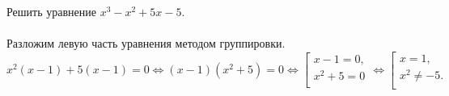\newcommand{\LRA}{\Leftrightarrow}
 Решить уравнение $x^3-x^2+5x-5$.\\
\Solution \\
Разложим левую часть уравнения методом группировки.
$$x^2(x-1)+5(x-1)=0\LRA
(x-1)\left(x^2+5\right)=0 \LRA
\left[ \begin{gathered} 
x-1=0, \\ 
x^2+5=0 \\ 
 \end{gathered} \right.\LRA
 \left[ \begin{gathered} 
x=1, \\ 
x^2\not=-5.\\ 
 \end{gathered} \right.
$$
